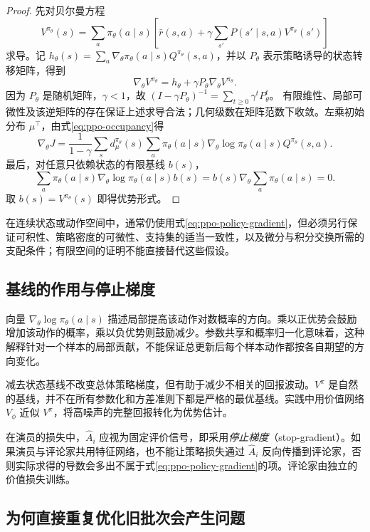 \documentclass[UTF8,12pt,a4paper,fontset=fandol]{ctexart}
\begin{document}
\begin{proof}
先对贝尔曼方程
\[
  V^{\pi_\theta}(s)
  =\sum_a\pi_\theta(a\mid s)
    \left[\bar r(s,a)+\gamma\sum_{s'}P(s'\mid s,a)
          V^{\pi_\theta}(s')\right]
\]
求导。记
$h_\theta(s)=\sum_a\nabla_\theta\pi_\theta(a\mid s)
Q^{\pi_\theta}(s,a)$，并以 $P_\theta$ 表示策略诱导的状态转移矩阵，得到
\[
  \nabla_\theta V^{\pi_\theta}
  =h_\theta+\gamma P_\theta\nabla_\theta V^{\pi_\theta}.
\]
因为 $P_\theta$ 是随机矩阵，$\gamma<1$，故
$(I-\gamma P_\theta)^{-1}=\sum_{t\ge0}\gamma^tP_\theta^t$。
有限维性、局部可微性及该逆矩阵的存在保证上述求导合法；几何级数在矩阵范数下收敛。左乘初始分布 $\mu^\top$，由式\eqref{eq:ppo-occupancy}得
\[
  \nabla_\theta J
  =\frac{1}{1-\gamma}\sum_s d^{\pi_\theta}_\mu(s)
     \sum_a\pi_\theta(a\mid s)
     \nabla_\theta\log\pi_\theta(a\mid s)
     Q^{\pi_\theta}(s,a).
\]
最后，对任意只依赖状态的有限基线 $b(s)$，
\[
  \sum_a\pi_\theta(a\mid s)
  \nabla_\theta\log\pi_\theta(a\mid s)b(s)
  =b(s)\nabla_\theta\sum_a\pi_\theta(a\mid s)=0.
\]
取 $b(s)=V^{\pi_\theta}(s)$ 即得优势形式。
\end{proof}

在连续状态或动作空间中，通常仍使用式\eqref{eq:ppo-policy-gradient}，但必须另行保证可积性、策略密度的可微性、支持集的适当一致性，以及微分与积分交换所需的支配条件；有限空间的证明不能直接替代这些假设。

\subsection{基线的作用与停止梯度}

向量 $\nabla_\theta\log\pi_\theta(a\mid s)$ 描述局部提高该动作对数概率的方向。乘以正优势会鼓励增加该动作的概率，乘以负优势则鼓励减少。参数共享和概率归一化意味着，这种解释针对一个样本的局部贡献，不能保证总更新后每个样本动作都按各自期望的方向变化。

减去状态基线不改变总体策略梯度，但有助于减少不相关的回报波动。$V^\pi$ 是自然的基线，并不在所有参数化和方差准则下都是严格的最优基线。实践中用价值网络 $V_\phi$ 近似 $V^\pi$，将高噪声的完整回报转化为优势估计。

在演员的损失中，$\widehat A_i$ 应视为固定评价信号，即采用\emph{停止梯度}（stop-gradient）。如果演员与评论家共用特征网络，也不能让策略损失通过 $\widehat A_i$ 反向传播到评论家，否则实际求得的导数会多出不属于式\eqref{eq:ppo-policy-gradient}的项。评论家由独立的价值损失训练。

\subsection{为何直接重复优化旧批次会产生问题}
\end{document}
